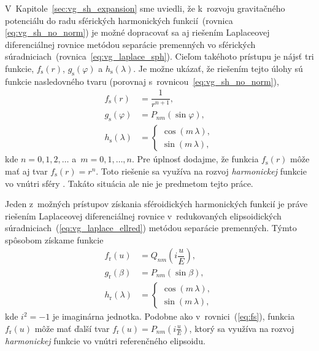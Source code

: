 \documentclass[a4paper,12pt]{book}
\begin{document}
V~Kapitole~\ref{sec:vg_sh_expansion} sme uviedli, že k~rozvoju gravitačného 
potenciálu do radu sférických harmonických funkcií~(rovnica 
\ref{eq:vg_sh_no_norm}) je možné dopracovať sa aj riešením Laplaceovej 
diferenciálnej rovnice metódou separácie premenných vo sférických 
súradniciach~(rovnica~\ref{eq:vg_laplace_sph}).  Cieľom takéhoto prístupu je 
nájsť tri funkcie, $f_{\mathrm{s}}(r)$, $g_{\mathrm{s}}(\varphi)$ 
a $h_{\mathrm{s}}(\lambda)$.  Je možne ukázať, že riešením tejto úlohy sú 
funkcie nasledovného tvaru (porovnaj s~rovnicou~\ref{eq:vg_sh_no_norm}),
%
\begin{align}
\label{eq:fs}
f_{\mathrm{s}}(r) &= \dfrac{1}{r^{n + 1}}{,}\\
%
\label{eq:gs}
g_{\mathrm{s}}(\varphi) &= P_{nm}(\sin\varphi){,}\\
%
\label{eq:hs}
h_{\mathrm{s}}(\lambda) &=
%
\begin{cases}
\cos(m\,\lambda){,}\\
\sin(m\,\lambda){,}
\end{cases}
\end{align}
%
kde $n = 0, 1, 2, \dots$ a~$m = 0, 1, \dots, n$.  Pre úplnosť dodajme, že 
funkcia $f_{\mathrm{s}}(r)$ môže mať aj tvar $f_{\mathrm{s}}(r) = r^n$.  Toto 
riešenie sa využíva na rozvoj \emph{harmonickej} funkcie vo vnútri sféry 
\parencite{MoritzPhysicalGeodesy}.  Takáto situácia ale nie je predmetom tejto 
práce.

Jeden z~možných prístupov získania sféroidických harmonických funkcií je práve 
riešením Laplaceovej diferenciálnej rovnice v~redukovaných elipsoidických 
súradniciach~(\ref{eq:vg_laplace_ellred}) metódou separácie premenných.  Týmto 
spôsobom získame funkcie \parencite{MoritzPhysicalGeodesy}
%
\begin{align}
\label{eq:fr}
f_{\mathrm{r}}(u) &=
Q_{nm}\left( i \dfrac{u}{E} \right){,}\\
%
\label{eq:gr}
g_{\mathrm{r}}(\beta) &= P_{nm}(\sin\beta){,}\\
%
\label{eq:hr}
h_{\mathrm{r}}(\lambda) &=
%
\begin{cases}
\cos(m\,\lambda){,}\\
\sin(m\,\lambda){,}
\end{cases}
\end{align}
%
kde $i^2 = -1$ je imaginárna jednotka.  Podobne ako v~rovnici~(\ref{eq:fs}), 
funkcia~$f_{\mathrm{r}}(u)$ môže mať ďalší tvar $f_{\mathrm{r}}(u) 
= P_{nm}\left( i \frac{u}{E} \right)$, ktorý sa využíva na rozvoj 
\emph{harmonickej} funkcie vo vnútri referenčného elipsoidu.
\end{document}
